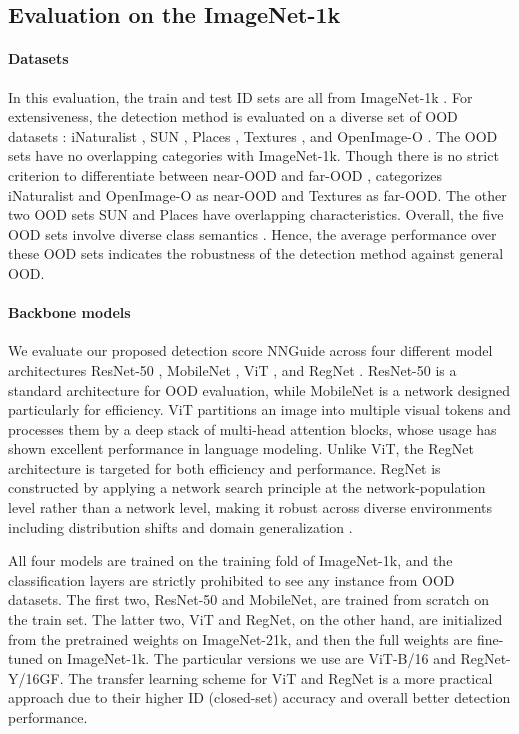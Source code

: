 \documentclass[10pt,twocolumn,letterpaper]{article}
\begin{document}
\subsection{Evaluation on the ImageNet-1k}
\label{sec:exp_in1k}


\paragraph{Datasets}
In this evaluation, the train and test ID sets are all from ImageNet-1k \cite{deng2009imagenet}. For extensiveness, the detection method is evaluated on a diverse set of OOD datasets \cite{huang2021mos}: iNaturalist \cite{van2018inaturalist}, SUN \cite{xiao2010sun}, Places \cite{zhou2017places}, Textures \cite{cimpoi2014describing}, and OpenImage-O \cite{wang2022vim}. The OOD sets have no overlapping categories with ImageNet-1k. Though there is no strict criterion to differentiate between near-OOD and far-OOD \cite{fang2022out}, \cite{yang2022openood} categorizes iNaturalist and OpenImage-O as near-OOD and Textures as far-OOD. The other two OOD sets SUN and Places have overlapping characteristics. Overall, the five OOD sets involve diverse class semantics \cite{huang2021mos}. Hence, the average performance over these OOD sets indicates the robustness of the detection method against general OOD. 

\paragraph{Backbone models}
We evaluate our proposed detection score NNGuide across four different model architectures ResNet-50 \cite{he2016deep}, MobileNet \cite{sandler2018mobilenetv2}, ViT \cite{dosovitskiy2020image}, and RegNet \cite{radosavovic2020designing}. ResNet-50 is a standard architecture for OOD evaluation, while MobileNet is a network designed particularly for efficiency. ViT  partitions an image into multiple visual tokens and processes them by a deep stack of multi-head attention blocks, whose usage has shown excellent performance in language modeling. Unlike ViT, the RegNet architecture is targeted for both efficiency and performance. RegNet is constructed by applying a network search principle at the network-population level rather than a network level, making it robust across diverse environments including distribution shifts and domain generalization \cite{cha2022domain,arpit2021ensemble}.

All four models are trained on the training fold of ImageNet-1k, and the classification layers are strictly prohibited to see any instance from OOD datasets. The first two, ResNet-50 and MobileNet, are trained from scratch on the train set. The latter two, ViT and RegNet, on the other hand, are initialized from the pretrained weights on ImageNet-21k, and then the full weights are fine-tuned on ImageNet-1k. The particular versions we use are ViT-B/16 and RegNet-Y/16GF. The transfer learning scheme for ViT and RegNet is a more practical approach due to their higher ID (closed-set) accuracy and overall better detection performance. 
\end{document}
